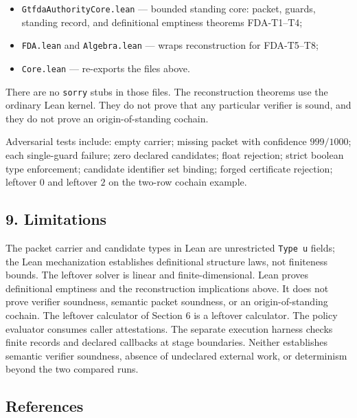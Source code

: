 \documentclass[
  11pt,
]{article}
\providecommand{\tightlist}{%
  \setlength{\itemsep}{0pt}\setlength{\parskip}{0pt}}
\begin{document}
\begin{itemize}
\tightlist
\item
  \nolinkurl{GtfdaAuthorityCore.lean} --- bounded standing core: packet, guards, standing record, and definitional emptiness theorems FDA-T1--T4;
\item
  \nolinkurl{FDA.lean} and \nolinkurl{Algebra.lean} --- wraps reconstruction for FDA-T5--T8;
\item
  \texttt{Core.lean} --- re-exports the files above.
\end{itemize}

There are no \texttt{sorry} stubs in those files. The reconstruction theorems use the ordinary Lean kernel. They do not prove that any particular verifier is sound, and they do not prove an origin-of-standing cochain.

Adversarial tests include: empty carrier; missing packet with confidence \(999/1000\); each single-guard failure; zero declared candidates; float rejection; strict boolean type enforcement; candidate identifier set binding; forged certificate rejection; leftover \(0\) and leftover \(2\) on the two-row cochain example.

\subsection{9. Limitations}\label{limitations}

The packet carrier and candidate types in Lean are unrestricted \texttt{Type\ u} fields; the Lean mechanization establishes definitional structure laws, not finiteness bounds. The leftover solver is linear and finite-dimensional. Lean proves definitional emptiness and the reconstruction implications above. It does not prove verifier soundness, semantic packet soundness, or an origin-of-standing cochain. The leftover calculator of Section 6 is a leftover calculator. The policy evaluator consumes caller attestations. The separate execution harness checks finite records and declared callbacks at stage boundaries. Neither establishes semantic verifier soundness, absence of undeclared external work, or determinism beyond the two compared runs.

\subsection{References}\label{references}
\end{document}
